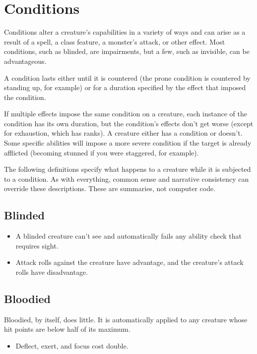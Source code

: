 \section{Conditions}
\label{sec:conditions}
Conditions alter a creature's capabilities in a variety of ways and can arise as a result of a spell, a class feature, a monster's attack, or other effect. Most conditions, such as blinded, are impairments, but a few, such as invisible, can be advantageous.

A condition lasts either until it is countered (the prone condition is countered by standing up, for example) or for a duration specified by the effect that imposed the condition.

If multiple effects impose the same condition on a creature, each instance of the condition has its own duration, but the condition's effects don't get worse (except for exhaustion, which has ranks). A creature either has a condition or doesn't. Some specific abilities will impose a more severe condition if the target is already afflicted (becoming stunned if you were staggered, for example).

The following definitions specify what happens to a creature while it is subjected to a condition. As with everything, common sense and narrative consistency can override these descriptions. These are summaries, not computer code.

\subsection{Blinded\label{condition:blinded}}
\begin{itemize}
    \item A blinded creature can't see and automatically fails any ability check that requires sight.
    \item Attack rolls against the creature have advantage, and the creature's attack rolls have disadvantage.
\end{itemize}

\subsection{Bloodied\label{condition:bloodied}}
Bloodied, by itself, does little. It is automatically applied to any creature whose hit points are below half of its maximum.
\begin{itemize}
    \item  Deflect, exert, and focus cost double.
\end{itemize}

